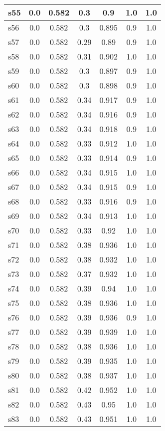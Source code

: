 \documentclass{article}
\begin{document}
\begin{tabular}{|l|c|c|c|c|c|c|}
s55 &0.0 & 0.582 & 0.3 & 0.9 & 1.0 & 1.0\\
\hline
s56 &0.0 & 0.582 & 0.3 & 0.895 & 0.9 & 1.0\\
\hline
s57 &0.0 & 0.582 & 0.29 & 0.89 & 0.9 & 1.0\\
\hline
s58 &0.0 & 0.582 & 0.31 & 0.902 & 1.0 & 1.0\\
\hline
s59 &0.0 & 0.582 & 0.3 & 0.897 & 0.9 & 1.0\\
\hline
s60 &0.0 & 0.582 & 0.3 & 0.898 & 0.9 & 1.0\\
\hline
s61 &0.0 & 0.582 & 0.34 & 0.917 & 0.9 & 1.0\\
\hline
s62 &0.0 & 0.582 & 0.34 & 0.916 & 0.9 & 1.0\\
\hline
s63 &0.0 & 0.582 & 0.34 & 0.918 & 0.9 & 1.0\\
\hline
s64 &0.0 & 0.582 & 0.33 & 0.912 & 1.0 & 1.0\\
\hline
s65 &0.0 & 0.582 & 0.33 & 0.914 & 0.9 & 1.0\\
\hline
s66 &0.0 & 0.582 & 0.34 & 0.915 & 1.0 & 1.0\\
\hline
s67 &0.0 & 0.582 & 0.34 & 0.915 & 0.9 & 1.0\\
\hline
s68 &0.0 & 0.582 & 0.33 & 0.916 & 0.9 & 1.0\\
\hline
s69 &0.0 & 0.582 & 0.34 & 0.913 & 1.0 & 1.0\\
\hline
s70 &0.0 & 0.582 & 0.33 & 0.92 & 1.0 & 1.0\\
\hline
s71 &0.0 & 0.582 & 0.38 & 0.936 & 1.0 & 1.0\\
\hline
s72 &0.0 & 0.582 & 0.38 & 0.932 & 1.0 & 1.0\\
\hline
s73 &0.0 & 0.582 & 0.37 & 0.932 & 1.0 & 1.0\\
\hline
s74 &0.0 & 0.582 & 0.39 & 0.94 & 1.0 & 1.0\\
\hline
s75 &0.0 & 0.582 & 0.38 & 0.936 & 1.0 & 1.0\\
\hline
s76 &0.0 & 0.582 & 0.39 & 0.936 & 0.9 & 1.0\\
\hline
s77 &0.0 & 0.582 & 0.39 & 0.939 & 1.0 & 1.0\\
\hline
s78 &0.0 & 0.582 & 0.38 & 0.936 & 1.0 & 1.0\\
\hline
s79 &0.0 & 0.582 & 0.39 & 0.935 & 1.0 & 1.0\\
\hline
s80 &0.0 & 0.582 & 0.38 & 0.937 & 1.0 & 1.0\\
\hline
s81 &0.0 & 0.582 & 0.42 & 0.952 & 1.0 & 1.0\\
\hline
s82 &0.0 & 0.582 & 0.43 & 0.95 & 1.0 & 1.0\\
\hline
s83 &0.0 & 0.582 & 0.43 & 0.951 & 1.0 & 1.0\\

\end{tabular}
\end{document}
